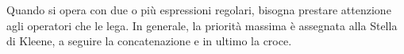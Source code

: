 \documentclass{subfiles}
\begin{document}
Quando si opera con due o più espressioni regolari, bisogna prestare attenzione agli operatori che le lega.
In generale, la priorità massima è assegnata alla Stella di Kleene, a seguire la concatenazione e in ultimo la croce.
\end{document}
